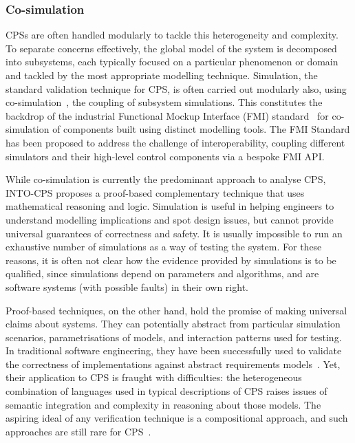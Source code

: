 \subsubsection{Co-simulation}

CPSs are often handled modularly to tackle this heterogeneity and complexity. To separate concerns effectively, the global model of the system is decomposed into subsystems, each typically focused on a particular phenomenon or domain and tackled by the most appropriate modelling technique. Simulation, the standard validation technique for CPS, is often carried out modularly also, using co-simulation~\cite{GomesTBLV2017,Gomes&18}, the coupling of subsystem simulations. This constitutes the backdrop of the industrial Functional Mockup Interface (FMI) standard~\cite{FMIStandard2014,BromanBGLMTW2013,CavalcantiWA16} for co-simulation of components built using distinct modelling tools. The FMI Standard has been proposed to address the challenge of interoperability, coupling different simulators and their high-level control components via a bespoke FMI API.

While co-simulation is currently the predominant approach to analyse CPS, INTO-CPS proposes a proof-based complementary technique that uses mathematical reasoning and logic. Simulation is useful in helping engineers to understand modelling implications and spot design issues, but cannot provide universal guarantees of correctness and safety. It is usually impossible to run an exhaustive number of simulations as a way of testing the system. For these reasons, it is often not clear how the evidence provided by simulations is to be qualified, since simulations depend on parameters and algorithms, and are software systems (with possible faults) in their own right.

Proof-based techniques, on the other hand, hold the promise of making universal claims about systems. They can potentially abstract from particular simulation scenarios, parametrisations of models, and interaction patterns used for testing. In traditional software engineering, they have been successfully used to validate the correctness of implementations against abstract requirements models~\cite{WoodcockLBF2009}. Yet, their application to CPS is fraught with difficulties: the heterogeneous combination of languages used in typical descriptions of CPS raises issues of semantic integration and complexity in reasoning about those models. The aspiring ideal of any verification technique is a compositional approach, and such approaches are still rare for CPS~\cite{NuzzoLFS2018}.

